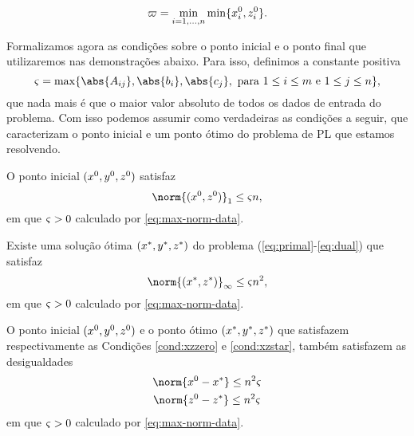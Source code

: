 \begin{equation}
\label{eq:bdxzzero}
	\varpi= \min_{i=1,\ldots,n}\min\{x^0_{i},z^0_{i}\}.
\end{equation}




Formalizamos agora as condições sobre o ponto inicial e o ponto final que utilizaremos nas demonstrações abaixo. Para isso, definimos a constante positiva
\begin{equation}
	\label{eq:max-norm-data}
 	\bdxzstar = \max\{\abs{A_{ij}},\abs{b_{i}},\abs{c_{j}}, \text{ para } 1\leq i\leq m \text{ e } 1\leq j \leq n  \},
\end{equation}
que nada mais é que o maior valor absoluto de todos os dados de entrada do problema. 
Com isso podemos assumir como verdadeiras as  condições a seguir, que caracterizam o ponto inicial e um ponto ótimo do problema de PL que estamos resolvendo. 

\begin{cond} \label{cond:xzzero} O ponto inicial $(x^0 ,y^0,z^0 )$ satisfaz 
\begin{equation}
	\label{eq:norm-xz-zero}
	\norm{(\xzero,\zzero)}_{1} \leq \bdxzstar n,
\end{equation}
em que  $\varsigma>0$ calculado por \eqref{eq:max-norm-data}.
\end{cond}

\begin{cond} \label{cond:xzstar} Existe uma solução ótima $(x^*,y^*,z^*)$  do problema (\ref{eq:primal}-\ref{eq:dual}) que satisfaz 
\begin{equation}
	\label{eq:norm-xz-star}
	\norm{(\xstar,\zstar)}_{\infty} \leq \bdxzstar n^2,
\end{equation}
em que  $\varsigma>0$ calculado por \eqref{eq:max-norm-data}. 
\end{cond}



\begin{cond}\label{cond:x0-x*+z0-z*}  O ponto inicial $(x^0 ,y^0,z^0 )$ e o ponto ótimo $(x^*,y^*,z^*)$ que satisfazem respectivamente as Condições \ref{cond:xzzero} e \ref{cond:xzstar}, também satisfazem as desigualdades
\begin{subequations}\label{eq:x0-x*+z0-z*}
\begin{gather}
\norm{\xzero - \xstar} \leq n^2 \bdxzstar \label{eq:x0-x*} \\
\norm{\zzero - \zstar} \leq n^2\bdxzstar \label{eq:z0-z*}
\end{gather}
\end{subequations}
em que  $\varsigma>0$ calculado por \eqref{eq:max-norm-data}. 
\end{cond}


